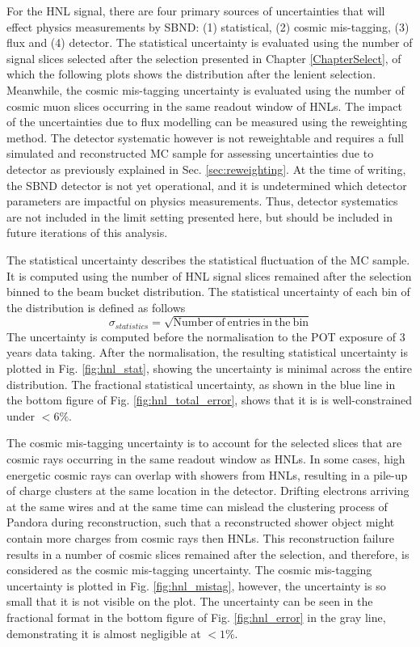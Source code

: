 For the HNL signal, there are four primary sources of uncertainties that will effect physics measurements by SBND: (1) statistical, (2) cosmic mis-tagging, (3) flux and (4) detector. 
The statistical uncertainty is evaluated using the number of signal slices selected after the selection presented in Chapter \ref{ChapterSelect}, of which the following plots shows the distribution after the lenient selection.
Meanwhile, the cosmic mis-tagging uncertainty is evaluated using the number of cosmic muon slices occurring in the same readout window of HNLs.
The impact of the uncertainties due to flux modelling can be measured using the reweighting method.
The detector systematic however is not reweightable and requires a full simulated and reconstructed MC sample for assessing uncertainties due to detector as previously explained in Sec. \ref{sec:reweighting}.
At the time of writing, the SBND detector is not yet operational, and it is undetermined which detector parameters are impactful on physics measurements.
Thus, detector systematics are not included in the limit setting presented here, but should be included in future iterations of this analysis.

The statistical uncertainty describes the statistical fluctuation of the MC sample.
It is computed using the number of HNL signal slices remained after the selection binned to the beam bucket distribution.
The statistical uncertainty of each bin of the distribution is defined as follows 
\begin{equation}
\label{eq:stat_err}
\sigma_{statistics} = \sqrt{\mathrm{Number\ of\ entries\ in\ the\ bin}}
\end{equation}
The uncertainty is computed before the normalisation to the POT exposure of 3 years data taking.
After the normalisation, the resulting statistical uncertainty is plotted in Fig. \ref{fig:hnl_stat}, showing the uncertainty is minimal across the entire distribution.
The fractional statistical uncertainty, as shown in the blue line in the bottom figure of Fig. \ref{fig:hnl_total_error}, shows that it is is well-constrained under $< 6\%$.

The cosmic mis-tagging uncertainty is to account for the selected slices that are cosmic rays occurring in the same readout window as HNLs.
In some cases, high energetic cosmic rays can overlap with showers from HNLs, resulting in a pile-up of charge clusters at the same location in the detector.
Drifting electrons arriving at the same wires and at the same time can mislead the clustering process of Pandora during reconstruction, such that a reconstructed shower object might contain more charges from cosmic rays then HNLs.
This reconstruction failure results in a number of cosmic slices remained after the selection, and therefore, is considered as the cosmic mis-tagging uncertainty.
The cosmic mis-tagging uncertainty is plotted in Fig. \ref{fig:hnl_mistag}, however, the uncertainty is so small that it is not visible on the plot.
The uncertainty can be seen in the fractional format in the bottom figure of Fig. \ref{fig:hnl_error} in the gray line, demonstrating it is almost negligible at $< 1\%$. 

